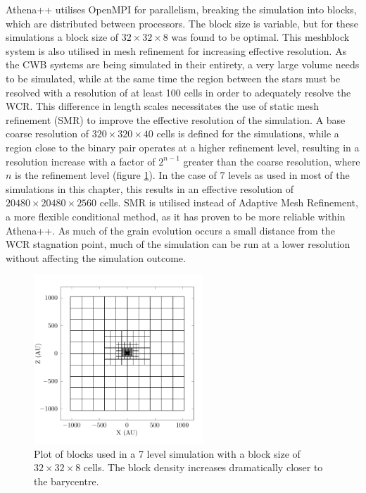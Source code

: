 \documentclass[fleqn,usenatbib]{mnras}
\begin{document}
Athena++ utilises OpenMPI for parallelism, breaking the simulation into blocks, which are distributed between processors.
The block size is variable, but for these simulations a block size of $32\times 32 \times 8$ was found to be optimal.
This meshblock system is also utilised in mesh refinement for increasing effective resolution.
As the CWB systems are being simulated in their entirety, a very large volume needs to be simulated, while at the same time the region between the stars must be resolved with a resolution of at least 100 cells in order to adequately resolve the WCR.
This difference in length scales necessitates the use of static mesh refinement (SMR) to improve the effective resolution of the simulation.
A base coarse resolution of $320 \times 320 \times 40$ cells is defined for the simulations, while a region close to the binary pair operates at a higher refinement level, resulting in a resolution increase with a factor of $2^{n-1}$ greater than the coarse resolution, where $n$ is the refinement level (figure \ref{fig:smr-grid}).
In the case of 7 levels as used in most of the simulations in this chapter, this results in an effective resolution of $20480 \times 20480 \times 2560$ cells.
SMR is utilised instead of Adaptive Mesh Refinement, a more flexible conditional method, as it has proven to be more reliable within Athena++.
As much of the grain evolution occurs a small distance from the WCR stagnation point, much of the simulation can be run at a lower resolution without affecting the simulation outcome.

\begin{figure}
  \centering
  \includegraphics[width=2.5in]{assets/mesh/gridxy.pdf}
  \caption[Static mesh refinement example]{Plot of blocks used in a 7 level simulation with a block size of $32\times 32 \times 8$ cells. The block density increases dramatically closer to the barycentre.}
  \label{fig:smr-grid}
\end{figure}
\end{document}
